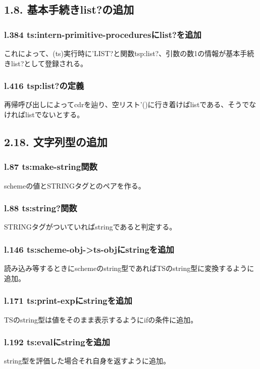 \documentclass{jarticle}
\begin{document}
\subsection{1.8. 基本手続きlist?の追加}
\subsubsection{l.384 ts:intern-primitive-proceduresにlist?を追加}
これによって、(ts)実行時に'LIST?と関数tsp:list?、引数の数1の情報が基本手続きlist?として登録される。\par
\subsubsection{l.416 tsp:list?の定義}
再帰呼び出しによってcdrを辿り、空リスト'()に行き着けばlistである、そうでなければlistでないとする。\par

\subsection{2.18. 文字列型の追加}
\subsubsection{l.87 ts:make-string関数}
schemeの値とSTRINGタグとのペアを作る。\par
\subsubsection{l.88 ts:string?関数}
STRINGタグがついていればstringであると判定する。\par
\subsubsection{l.146 ts:scheme-obj->ts-objにstringを追加}
読み込み等するときにschemeのstring型であればTSのstring型に変換するように追加。\par
\subsubsection{l.171 ts:print-expにstringを追加}
TSのstring型は値をそのまま表示するようにifの条件に追加。\par
\subsubsection{l.192 ts:evalにstringを追加}
string型を評価した場合それ自身を返すように追加。\par
\end{document}
